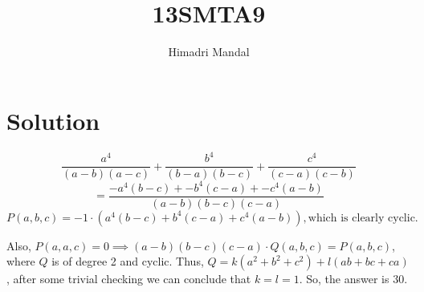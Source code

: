 \documentclass[11pt]{scrartcl}
\title{13SMTA9}
\author{Himadri Mandal}
\begin{document}
\maketitle

\section{Solution}
\begin{soln}
  \raggedright{}
  \[ \dfrac{a^4}{(a-b)(a-c)} + \dfrac{b^4}{(b-a)(b-c)} + \dfrac{c^4}{(c-a)(c-b)} \]
  \[ = \frac{-a^4(b-c) + -b^4(c-a) + -c^4(a-b)}{(a-b)(b-c)(c-a)} \]
  \[ P(a,b,c) = -1 \cdot \left( a^4(b-c) + b^4(c-a) + c^4(a-b) \right), \text{which is clearly cyclic.} \]

  Also, $P(a,a,c) = 0 \implies (a-b)(b-c)(c-a) \cdot Q(a,b,c) = P(a,b,c)$, where $Q$ is of degree 2
  and cyclic. Thus, $Q = k(a^2 + b^2 + c^2) + l(ab+bc+ca)$, after some trivial checking we can conclude that
  $k = l = 1$. So, the answer is $30$.
\end{soln}
\end{document}
